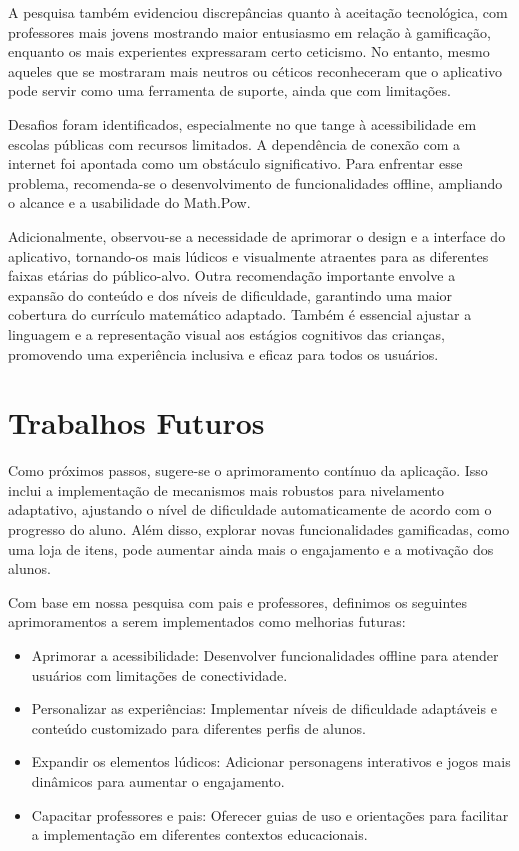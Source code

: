 A pesquisa também evidenciou discrepâncias quanto à aceitação tecnológica, com professores mais jovens mostrando maior entusiasmo em relação à gamificação, enquanto os mais experientes expressaram certo ceticismo. No entanto, mesmo aqueles que se mostraram mais neutros ou céticos reconheceram que o aplicativo pode servir como uma ferramenta de suporte, ainda que com limitações.

Desafios foram identificados, especialmente no que tange à acessibilidade em escolas públicas com recursos limitados. A dependência de conexão com a internet foi apontada como um obstáculo significativo. Para enfrentar esse problema, recomenda-se o desenvolvimento de funcionalidades offline, ampliando o alcance e a usabilidade do Math.Pow.

Adicionalmente, observou-se a necessidade de aprimorar o design e a interface do aplicativo, tornando-os mais lúdicos e visualmente atraentes para as diferentes faixas etárias do público-alvo. Outra recomendação importante envolve a expansão do conteúdo e dos níveis de dificuldade, garantindo uma maior cobertura do currículo matemático adaptado. Também é essencial ajustar a linguagem e a representação visual aos estágios cognitivos das crianças, promovendo uma experiência inclusiva e eficaz para todos os usuários.

\section{Trabalhos Futuros}

Como próximos passos, sugere-se o aprimoramento contínuo da aplicação. Isso inclui a implementação de mecanismos mais robustos para nivelamento adaptativo, ajustando o nível de dificuldade automaticamente de acordo com o progresso do aluno. Além disso, explorar novas funcionalidades gamificadas, como uma loja de itens, pode aumentar ainda mais o engajamento e a motivação dos alunos.

Com base em nossa pesquisa com pais e professores, definimos os seguintes aprimoramentos a serem implementados como melhorias futuras:

\begin{itemize}
    \item Aprimorar a acessibilidade: Desenvolver funcionalidades offline para atender usuários com limitações de conectividade.
    \item Personalizar as experiências: Implementar níveis de dificuldade adaptáveis e conteúdo customizado para diferentes perfis de alunos.
    \item Expandir os elementos lúdicos: Adicionar personagens interativos e jogos mais dinâmicos para aumentar o engajamento.
    \item Capacitar professores e pais: Oferecer guias de uso e orientações para facilitar a implementação em diferentes contextos educacionais.
\end{itemize}
    
